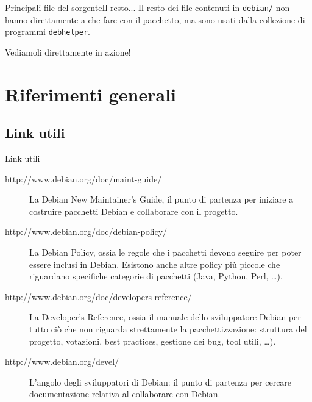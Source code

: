 \documentclass{beamer}
\begin{document}
\begin{frame}{Principali file del sorgente}{Il resto...}
	Il resto dei file contenuti in {\tt debian/} non hanno direttamente a che fare con il pacchetto, ma sono usati dalla collezione di programmi {\tt debhelper}.
	\pause

	Vediamoli direttamente in azione!
\end{frame}

\section{Riferimenti generali}

\begin{frame}
\tableofcontents[currentsection]
\end{frame}

\subsection{Link utili}

\begin{frame}{Link utili}
	\small
	\begin{description}
	\item[http://www.debian.org/doc/maint-guide/] La Debian New Maintainer's Guide, il punto di partenza per iniziare a costruire pacchetti Debian e collaborare con il progetto.
	\item[http://www.debian.org/doc/debian-policy/] La Debian Policy, ossia le regole che i pacchetti devono seguire per poter essere inclusi in Debian. Esistono anche altre policy più piccole che riguardano specifiche categorie di pacchetti (Java, Python, Perl, \dots).
	\item[http://www.debian.org/doc/developers-reference/] La Developer's Reference, ossia il manuale dello sviluppatore Debian per tutto ciò che non riguarda strettamente la pacchettizzazione: struttura del progetto, votazioni, best practices, gestione dei bug, tool utili, \dots).
	\item[http://www.debian.org/devel/] L'angolo degli sviluppatori di Debian: il punto di partenza per cercare documentazione relativa al collaborare con Debian.
	\end{description}
\end{frame}
\end{document}
